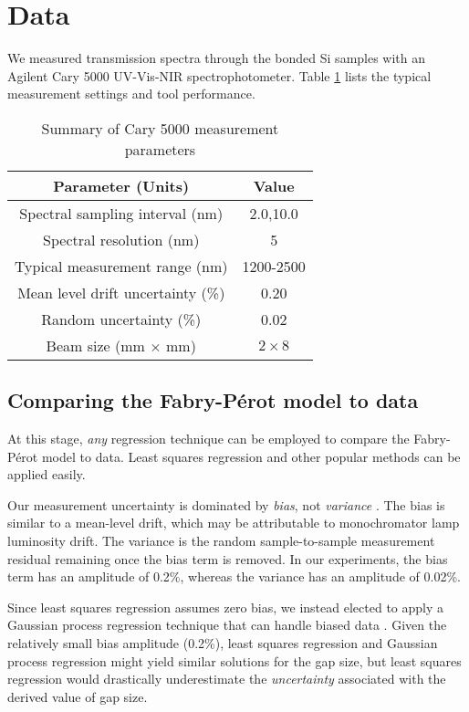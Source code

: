 \documentclass[osajnl,twocolumn,showpacs,superscriptaddress,11pt]{revtex4-1} %
\begin{document}
\section{Data}

We measured transmission spectra through the bonded Si samples with an Agilent Cary 5000 UV-Vis-NIR spectrophotometer.  Table \ref{tabCary5000pars} lists the typical measurement settings and tool performance.

\begin{table}[!htbp]
\caption{Summary of Cary 5000 measurement parameters \label{tabCary5000pars}}
\begin{center}
\begin{tabular}{ c c }
\hline
        Parameter (Units) & Value \\ 
\hline
        Spectral sampling interval (nm) & 2.0,10.0 \\
        Spectral resolution (nm) & 5 \\
        Typical measurement range (nm) & 1200-2500 \\
		Mean level drift uncertainty (\%) & 0.20 \\
		Random uncertainty (\%) & 0.02 \\
 		Beam size (mm $\times$ mm) & $2 \times 8$ \\
    \hline
    \end{tabular}
\end{center}
\end{table}

\subsection{Comparing the Fabry-P\'{e}rot model to data}

At this stage, \emph{any} regression technique can be employed to compare the Fabry-P\'{e}rot model to data.  Least squares regression and other popular methods can be applied easily.  

Our measurement uncertainty is dominated by \emph{bias}, not \emph{variance} \cite{2013sdmm.book.....I}.  The bias is similar to a mean-level drift, which may be attributable to monochromator lamp luminosity drift.  The variance is the random sample-to-sample measurement residual remaining once the bias term is removed.  In our experiments, the bias term has an amplitude of 0.2\%, whereas the variance has an amplitude of 0.02\%.

Since least squares regression assumes zero bias, we instead elected to apply a Gaussian process regression technique that can handle biased data \cite{2013sdmm.book.....I,DFMgp,rasmussen2006gaussian}.  Given the relatively small bias amplitude (0.2\%), least squares regression and Gaussian process regression might yield similar solutions for the gap size, but least squares regression would drastically underestimate the \emph{uncertainty} associated with the derived value of gap size\cite{DFMgp}.
\end{document}
